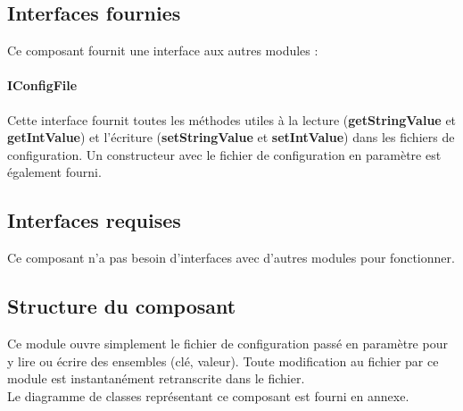 \subsection{Interfaces fournies}

Ce composant fournit une interface aux autres modules :

\paragraph{IConfigFile}

Cette interface fournit toutes les méthodes utiles à la lecture (\textbf{getStringValue} et \textbf{getIntValue}) et l'écriture (\textbf{setStringValue} et \textbf{setIntValue}) dans les fichiers de configuration. Un constructeur avec le fichier de configuration en paramètre est également fourni.

\subsection{Interfaces requises}

Ce composant n'a pas besoin d'interfaces avec d'autres modules pour fonctionner.

\subsection{Structure du composant}

Ce module ouvre simplement le fichier de configuration passé en paramètre pour y lire ou écrire des ensembles (clé, valeur). Toute modification au fichier par ce module est instantanément retranscrite dans le fichier.\\

Le diagramme de classes représentant ce composant est fourni en annexe.